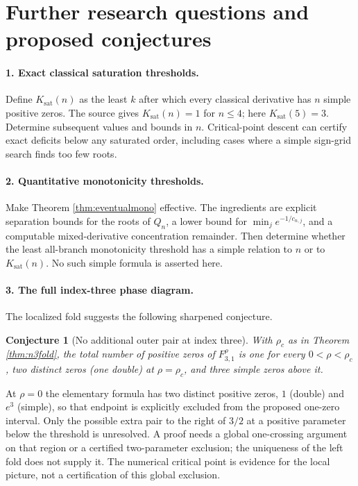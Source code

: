 \documentclass[11pt]{article}
\numberwithin{equation}{section}
\newtheorem{conjecture}[theorem]{Conjecture}
\theoremstyle{definition}\newtheorem{definition}[theorem]{Definition}
\theoremstyle{remark}\newtheorem{remark}[theorem]{Remark}
\begin{document}
\section{Further research questions and proposed conjectures}\label{sec:questions}
\paragraph{1. Exact classical saturation thresholds.}
Define $K_{\mathrm{sat}}(n)$ as the least $k$ after which every classical derivative has $n$ simple positive zeros. The source gives $K_{\mathrm{sat}}(n)=1$ for $n\leq4$; here $K_{\mathrm{sat}}(5)=3$. Determine subsequent values and bounds in $n$. Critical-point descent can certify exact deficits below any saturated order, including cases where a simple sign-grid search finds too few roots.

\paragraph{2. Quantitative monotonicity thresholds.}
Make Theorem \ref{thm:eventualmono} effective. The ingredients are explicit separation bounds for the roots of $Q_n$, a lower bound for $\min_j e^{-1/c_{n,j}}$, and a computable mixed-derivative concentration remainder. Then determine whether the least all-branch monotonicity threshold has a simple relation to $n$ or to $K_{\mathrm{sat}}(n)$. No such simple formula is asserted here.

\paragraph{3. The full index-three phase diagram.}
The localized fold suggests the following sharpened conjecture.
\begin{conjecture}[No additional outer pair at index three]\label{conj:n3}
With $\rho_c$ as in Theorem \ref{thm:n3fold}, the total number of positive zeros of $F_{3,1}^{\rho}$ is one for every $0<\rho<\rho_c$, two distinct zeros (one double) at $\rho=\rho_c$, and three simple zeros above it.
\end{conjecture}
At $\rho=0$ the elementary formula has two distinct positive zeros, $1$ (double) and $e^3$ (simple), so that endpoint is explicitly excluded from the proposed one-zero interval. Only the possible extra pair to the right of $3/2$ at a positive parameter below the threshold is unresolved. A proof needs a global one-crossing argument on that region or a certified two-parameter exclusion; the uniqueness of the left fold does not supply it. The numerical critical point is evidence for the local picture, not a certification of this global exclusion.
\end{document}
